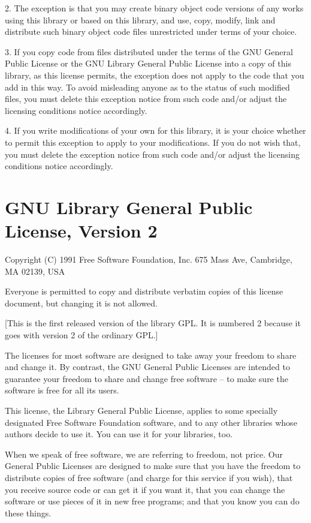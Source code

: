 \documentclass[a4paper,11pt]{report}
\begin{document}
2. The exception is that you may create binary object code versions of any 
works using this library or based on this library, and use, copy, modify, 
link and distribute such binary object code files unrestricted under terms 
of your choice. 

3. If you copy code from files distributed under the terms of the GNU 
General Public License or the GNU Library General Public License into a 
copy of this library, as this license permits, the exception does not 
apply to the code that you add in this way. To avoid misleading anyone as 
to the status of such modified files, you must delete this exception 
notice from such code and/or adjust the licensing conditions notice
accordingly. 

4. If you write modifications of your own for this library, it is your 
choice whether to permit this exception to apply to your modifications. 
If you do not wish that, you must delete the exception notice from such 
code and/or adjust the licensing conditions notice accordingly. 

\section*{GNU Library General Public License, Version 2}

Copyright (C) 1991 Free Software Foundation, Inc.
675 Mass Ave, Cambridge, MA 02139, USA

Everyone is permitted to copy and distribute verbatim copies
of this license document, but changing it is not allowed.

[This is the first released version of the library GPL. It is
numbered 2 because it goes with version 2 of the ordinary GPL.]


The licenses for most software are designed to take away your
freedom to share and change it. By contrast, the GNU General Public
Licenses are intended to guarantee your freedom to share and change
free software -- to make sure the software is free for all its users.

This license, the Library General Public License, applies to some
specially designated Free Software Foundation software, and to any
other libraries whose authors decide to use it. You can use it for
your libraries, too.

When we speak of free software, we are referring to freedom, not
price. Our General Public Licenses are designed to make sure that you
have the freedom to distribute copies of free software (and charge for
this service if you wish), that you receive source code or can get it
if you want it, that you can change the software or use pieces of it
in new free programs; and that you know you can do these things.
\end{document}
